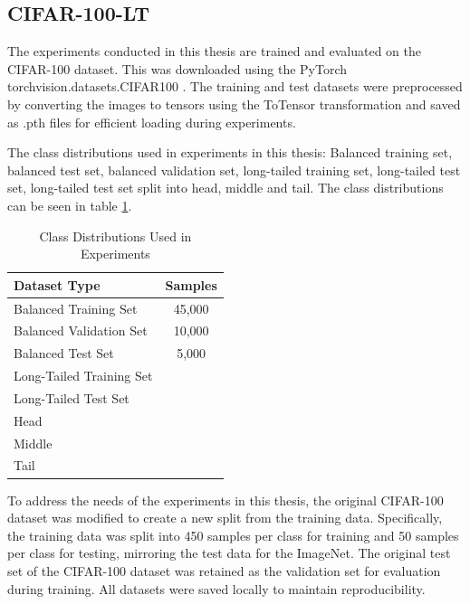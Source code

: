 \subsection{CIFAR-100-LT}
The experiments conducted in this thesis are trained and evaluated on the CIFAR-100 dataset. This was downloaded using the PyTorch torchvision.datasets.CIFAR100 \cite{pytorch_cifar100}. The training and test datasets were preprocessed by converting the images to tensors using the ToTensor transformation and saved as .pth files for efficient loading during experiments. 

The class distributions used in experiments in this thesis: Balanced training set, balanced test set, balanced validation set, long-tailed training set, long-tailed test set, long-tailed test set split into head, middle and tail. The class distributions can be seen in table \ref{tab:class_distributions}.

\begin{table}[h!]
    \centering
    \caption{Class Distributions Used in Experiments}
    \label{tab:class_distributions}
    \begin{tabular}{|l|c|}
    \hline
    \textbf{Dataset Type}                       & \textbf{Samples}                                                                 \\ \hline
    Balanced Training Set                       & 45,000        \\ \hline
    Balanced Validation Set                     & 10,000    \\ \hline
    Balanced Test Set                           & 5,000    \\ \hline
    Long-Tailed Training Set                    & \todo{-}      \\ \hline
    Long-Tailed Test Set                        & \todo{-} \\ \hline
    Head  & \todo{-} \\ \hline
    Middle   & \todo{-} \\ \hline
    Tail  & \todo{-} \\ \hline
    \end{tabular}
    \end{table}
    

To address the needs of the experiments in this thesis, the original CIFAR-100 dataset was modified to create a new split from the training data. Specifically, the training data was split into 450 samples per class for training and 50 samples per class for testing, mirroring the test data for the ImageNet. The original test set of the CIFAR-100 dataset was retained as the validation set for evaluation during training. All datasets were saved locally to maintain reproducibility.

